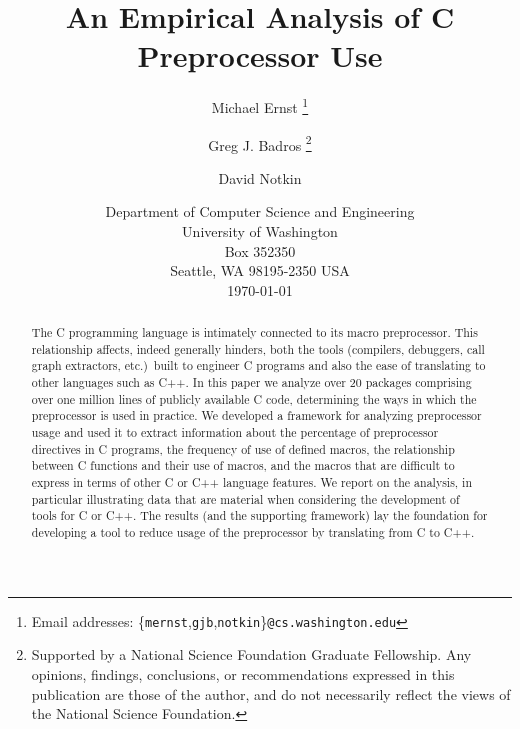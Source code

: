 \documentclass[11pt]{article}
\begin{document}
% 


\title{An Empirical Analysis of C Preprocessor Use}

\author{Michael Ernst%
  \thanks{Email addresses: \{{\tt mernst},{\tt gjb},{\tt notkin}\}{\tt @cs.washington.edu}}
  \and Greg J. Badros%
  \thanks{Supported by a National Science Foundation
    Graduate Fellowship. Any opinions, findings, conclusions, or
    recommendations expressed in this publication are those of the
    author, and do not necessarily reflect the views of the National
    Science Foundation.}
  \and David Notkin}

\date{Department of Computer
Science and Engineering\\
University of Washington\\
Box 352350\\
Seattle, WA  98195-2350  USA\\
\today}  

\maketitle


\begin{abstract}

  The C programming language is intimately connected to its macro
  preprocessor.  This relationship affects, indeed generally hinders,
  both the tools (compilers, debuggers, call graph extractors, etc.)\ 
  built to engineer C programs and also the ease of translating to other
  languages such as C++.  In this paper we analyze over 20 packages
  comprising over one million lines of publicly available C code,
  determining the ways in which the preprocessor is used in practice.
  We developed a framework for analyzing preprocessor usage and used it to
  extract information about the percentage of preprocessor directives in
  C programs, the frequency of use of defined macros, the relationship
  between C functions and their use of macros, and the macros that are
  difficult to express in terms of other C or C++ language features.  We
  report on the analysis, in particular illustrating data that are
  material when considering the development of tools for C or C++.  The
  results (and the supporting framework) lay the foundation for
  developing a tool to reduce usage of the preprocessor by translating
  from C to C++.

\end{abstract}

\bigskip
\end{document}
